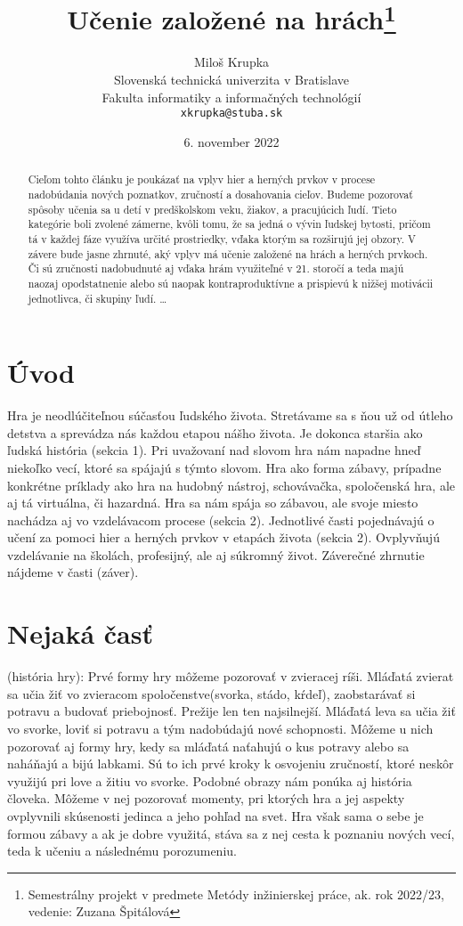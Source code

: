 \documentclass[10pt,twoside,slovak,a4paper]{article}
\title{Učenie založené na hrách\thanks{Semestrálny projekt v predmete Metódy inžinierskej práce, ak. rok 2022/23, vedenie: Zuzana Špitálová}} %
\author{Miloš Krupka\\[2pt]
	{\small Slovenská technická univerzita v Bratislave}\\
	{\small Fakulta informatiky a informačných technológií}\\
	{\small \texttt{xkrupka@stuba.sk}}
	}
\date{\small 6. november 2022} %
\begin{document}
\maketitle

\begin{abstract}
Cieľom tohto článku je poukázať na vplyv hier a herných prvkov v procese nadobúdania nových poznatkov, zručností a dosahovania cieľov. Budeme pozorovať spôsoby učenia sa u detí v predškolskom veku, žiakov, a pracujúcich ľudí.  Tieto kategórie boli zvolené zámerne, kvôli tomu, že sa jedná o vývin ľudskej bytosti, pričom tá v každej fáze využíva určité prostriedky, vďaka ktorým sa rozširujú jej obzory.  V závere bude jasne zhrnuté, aký vplyv má učenie založené na hrách a herných prvkoch. Či sú zručnosti nadobudnuté aj vďaka hrám využiteľné v 21. storočí a teda majú naozaj opodstatnenie alebo sú naopak kontraproduktívne a prispievú k nižšej motivácii jednotlivca, či skupiny ľudí.
\ldots
\end{abstract}



\section{Úvod}

Hra je neodlúčiteľnou súčasťou ľudského života. Stretávame sa s ňou už od útleho detstva a sprevádza nás každou etapou nášho života. Je dokonca staršia ako ľudská história (sekcia 1). Pri uvažovaní nad slovom hra nám napadne hneď niekoľko vecí, ktoré sa spájajú s týmto slovom. Hra ako forma zábavy, prípadne konkrétne príklady ako hra na hudobný nástroj, schovávačka, spoločenská hra, ale aj tá virtuálna, či hazardná. Hra sa nám spája so zábavou, ale svoje miesto nachádza aj vo vzdelávacom procese (sekcia 2). Jednotlivé časti pojednávajú o učení za pomoci hier a herných prvkov v etapách života (sekcia 2). Ovplyvňujú vzdelávanie na školách, profesijný, ale aj súkromný život.  Záverečné zhrnutie nájdeme v časti (záver).



\section{Nejaká časť} \label{nejaka}

(história hry):
Prvé formy hry môžeme pozorovať v zvieracej ríši. Mláďatá zvierat sa učia žiť vo zvieracom spoločenstve(svorka, stádo, kŕdeľ), zaobstarávať si potravu a budovať priebojnosť. Prežije len ten najsilnejší. Mláďatá leva sa učia žiť vo svorke, loviť si potravu a tým nadobúdajú nové schopnosti. Môžeme u nich pozorovať aj formy hry, kedy sa mláďatá naťahujú o kus potravy alebo sa naháňajú a bijú labkami. Sú to ich prvé kroky k osvojeniu zručností, ktoré neskôr využijú pri love a žitiu vo svorke. Podobné obrazy nám ponúka aj história človeka. Môžeme v nej pozorovať momenty, pri ktorých hra a jej aspekty ovplyvnili skúsenosti jedinca a jeho pohľad na svet. Hra však sama o sebe je formou zábavy a ak je dobre využitá, stáva sa z nej cesta k poznaniu nových vecí, teda k učeniu a následnému porozumeniu. 
\end{document}
